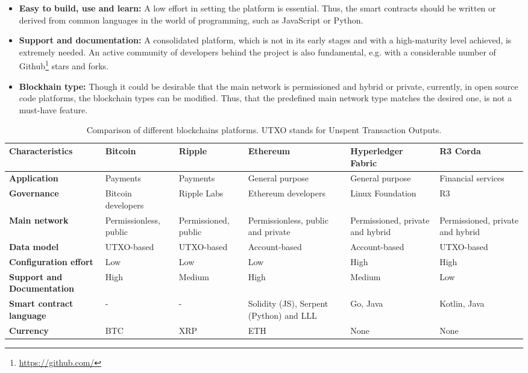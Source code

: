 \begin{itemize}
    \item \textbf{Easy to build, use and learn:} A low effort in setting the platform is essential. Thus, the smart contracts should be written or derived from common languages in the world of programming, such as JavaScript or Python.
    \item \textbf{Support and documentation:} A consolidated platform, which is not in its early stages and with a high-maturity level achieved, is extremely needed. An active community of developers behind the project is also fundamental, e.g. with a considerable number of Github\footnote{\url{https://github.com/}} stars and forks.
    \item \textbf{Blockhain type:} Though it could be desirable that the main network is permissioned and hybrid or private, currently, in open source code platforms, the blockchain types can be modified. Thus, that the predefined main network type matches the desired one, is not a must-have feature.
\end{itemize}

\begin{table}[bth]
	\myfloatalign \footnotesize
	\begin{tabularx}{\textwidth}{>{\raggedright\arraybackslash}p{2.5cm}>{\raggedright\arraybackslash}p{2.5cm}>{\raggedright\arraybackslash}p{2.5cm}>{\raggedright\arraybackslash}p{2.5cm}>{\raggedright\arraybackslash}p{2.5cm}>{\raggedright\arraybackslash}p{2.5cm}}
		\textbf{Characteristics} & \textbf{Bitcoin} & \textbf{Ripple} & \textbf{Ethereum} & \textbf{Hyperledger Fabric} & \textbf{R3 Corda}\\ 
		\hline
		\textbf{Application} & Payments & Payments & General purpose & General purpose & Financial services \\
		\textbf{Governance} & Bitcoin developers & Ripple Labs & Ethereum developers & Linux Foundation & R3 \\
		\textbf{Main network} & Permissionless, public & Permissioned, public & Permissionless, public and private & Permissioned, private and hybrid & Permissioned, private and hybrid \\
		\textbf{Data model} & UTXO-based & UTXO-based & Account-based & Account-based & UTXO-based \\
		\textbf{Configuration effort} & Low & Low & Low & High & High \\
		\textbf{Support and Documentation} & High & Medium & High & Medium & Low \\
		\textbf{Smart contract language} & - & - & Solidity (JS), Serpent (Python) and LLL & Go, Java & Kotlin, Java \\
		\textbf{Currency} & BTC & XRP & ETH & None & None \\
	\hline
	\end{tabularx}
		\caption{Comparison of different blockchains platforms. UTXO stands for Unspent Transaction Outputs.}
	\label{tab:blockchainComparison}
\end{table}

